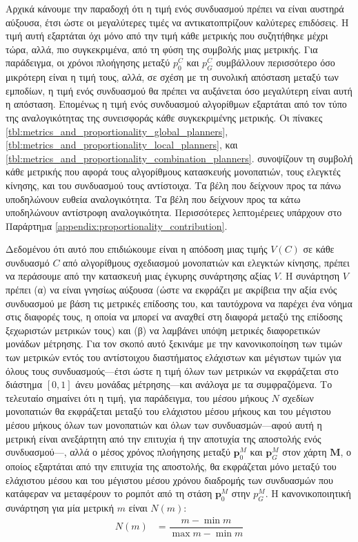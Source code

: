Αρχικά κάνουμε την παραδοχή ότι η τιμή ενός συνδυασμού πρέπει να είναι αυστηρά
αύξουσα, έτσι ώστε οι μεγαλύτερες τιμές να αντικατοπτρίζουν καλύτερες
επιδόσεις. Η τιμή αυτή εξαρτάται όχι μόνο από την τιμή κάθε μετρικής που
συζητήθηκε μέχρι τώρα, αλλά, πιο συγκεκριμένα, από τη φύση της συμβολής μιας
μετρικής. Για παράδειγμα, οι χρόνοι πλοήγησης μεταξύ $p_0^{C}$ και
$p_G^{C}$ συμβάλλουν περισσότερο όσο μικρότερη είναι η τιμή τους, αλλά,
σε σχέση με τη συνολική απόσταση μεταξύ των εμποδίων, η τιμή ενός συνδυασμού θα
πρέπει να αυξάνεται όσο μεγαλύτερη είναι αυτή η απόσταση. Επομένως η τιμή ενός
συνδυασμού αλγορίθμων εξαρτάται από τον τύπο της αναλογικότητας της συνεισφοράς
κάθε συγκεκριμένης μετρικής. Οι πίνακες
\ref{tbl:metrics_and_proportionality_global_planners},
\ref{tbl:metrics_and_proportionality_local_planners}, και
\ref{tbl:metrics_and_proportionality_combination_planners}.
συνοψίζουν τη συμβολή κάθε μετρικής που αφορά τους αλγορίθμους κατασκευής
μονοπατιών, τους ελεγκτές κίνησης, και του συνδυασμού τους αντίστοιχα. Τα βέλη
που δείχνουν προς τα πάνω υποδηλώνουν ευθεία αναλογικότητα. Τα βέλη που
δείχνουν προς τα κάτω υποδηλώνουν αντίστροφη αναλογικότητα. Περισσότερες
λεπτοµέρειες υπάρχουν στο Παράρτηµα
\ref{appendix:proportionality_contribution}.

Δεδομένου ότι αυτό που επιδιώκουμε είναι η απόδοση μιας τιμής $V(C)$ σε κάθε
συνδυασμό $C$ από αλγορίθμους σχεδιασμού μονοπατιών και ελεγκτών κίνησης,
πρέπει να περάσουμε από την κατασκευή μιας έγκυρης συνάρτησης αξίας $V$. Η
συνάρτηση $V$ πρέπει (α) να είναι γνησίως αύξουσα (ώστε να εκφράζει με ακρίβεια
την αξία ενός συνδυασμού με βάση τις μετρικές επίδοσης του, και ταυτόχρονα να
παρέχει ένα νόημα στις διαφορές τους, η οποία να μπορεί να αναχθεί στη διαφορά
μεταξύ της επίδοσης ξεχωριστών μετρικών τους) και (β) να λαμβάνει υπόψη
μετρικές διαφορετικών μονάδων μέτρησης. Για τον σκοπό αυτό ξεκινάμε με την
κανονικοποίηση των τιμών των μετρικών εντός του αντίστοιχου διαστήματος
ελάχιστων και μέγιστων τιμών για όλους τους συνδυασμούς---έτσι ώστε η τιμή όλων
των μετρικών να εκφράζεται στο διάστημα $[0,1]$ άνευ μονάδας μέτρησης---και
ανάλογα με τα συμφραζόμενα. Το τελευταίο σημαίνει ότι η τιμή, για παράδειγμα,
του μέσου μήκους $N$ σχεδίων μονοπατιών θα εκφράζεται μεταξύ του ελάχιστου
μέσου μήκους και του μέγιστου μέσου μήκους όλων των μονοπατιών και όλων των
συνδυασμών---αφού αυτή η μετρική είναι ανεξάρτητη από την επιτυχία ή την
αποτυχία της αποστολής ενός συνδυασμού---, αλλά ο μέσος χρόνος πλοήγησης μεταξύ
$\bm{p}_0^M$ και $\bm{p}_G^M$ στον χάρτη $\bm{M}$, ο οποίος εξαρτάται από την
επιτυχία της αποστολής, θα εκφράζεται μόνο μεταξύ του ελάχιστου μέσου και του
μέγιστου μέσου χρόνου διαδρομής των συνδυασμών που κατάφεραν να μεταφέρουν το
ρομπότ από τη στάση $\bm{p}_0^M$ στην ${p}_G^M$. Η κανονικοποιητική συνάρτηση
για μία μετρική $m$ είναι $N(m)$:
\begin{align}
  N(m) &= \dfrac{m - \min m}{\max m - \min m}
\end{align}

